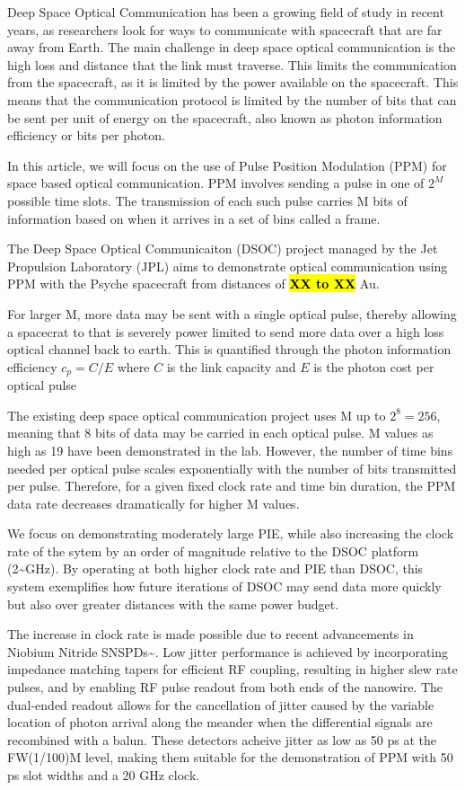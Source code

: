 \documentclass{optica-article}
\begin{document}
Deep Space Optical Communication has been a growing field of study in recent years, as researchers look for ways to communicate with spacecraft that are far away from Earth. The main challenge in deep space optical communication is the high loss and distance that the link must traverse. This limits the communication from the spacecraft, as it is limited by the power available on the spacecraft. This means that the communication protocol is limited by the number of bits that can be sent per unit of energy on the spacecraft, also known as photon information efficiency or bits per photon.

In this article, we will focus on the use of Pulse Position Modulation (PPM) for space based optical communication. PPM involves sending a pulse in one of $2^M$ possible time slots. The transmission of each such pulse carries M bits of information based on when it arrives in a set of bins called a frame.

The Deep Space Optical Communicaiton (DSOC) project managed by the Jet Propulsion Laboratory (JPL) aims to demonstrate optical communication using PPM with the Psyche spacecraft from distances of \textbf{\hl{XX to XX}} Au.

For larger M, more data may be sent with a single optical pulse, thereby allowing a spacecrat to that is severely power limited to send more data over a high loss optical channel back to earth. This is quantified through the photon information efficiency $c_p = C/E$ where $C$ is the link capacity and $E$ is the photon cost per optical pulse

The existing deep space optical communication project uses M up to $2^8 = 256$, meaning that 8 bits of data may be carried in each optical pulse. M values as high as 19 have been demonstrated in the lab\cite{essiambre2023record}. However, the number of time bins needed per optical pulse scales exponentially with the number of bits transmitted per pulse. Therefore, for a given fixed clock rate and time bin duration, the PPM data rate decreases dramatically for higher M values.

We focus on demonstrating moderately large PIE, while also increasing the clock rate of the sytem by an order of magnitude relative to the DSOC platform (2\textasciitilde GHz). By operating at both higher clock rate and PIE than DSOC, this system exemplifies how future iterations of DSOC may send data more quickly but also over greater distances with the same power budget.

The increase in clock rate is made possible due to recent advancements in Niobium Nitride SNSPDs\textasciitilde{}\cite{Colangelo2023}. Low jitter performance is achieved by incorporating impedance matching tapers for efficient RF coupling, resulting in higher slew rate pulses, and by enabling RF pulse readout from both ends of the nanowire. The dual-ended readout allows for the cancellation of jitter caused by the variable location of photon arrival along the meander when the differential signals are recombined with a balun.
These detectors acheive jitter as low as 50 ps at the FW(1/100)M level, making them suitable for the demonstration of PPM with 50 ps slot widths and a 20 GHz clock.
\end{document}
